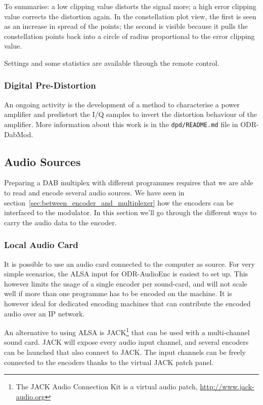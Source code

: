 To summarise: a low clipping value distorts the signal more; a high error
clipping value corrects the distortion again.
In the constellation plot view, the first is seen as an increase in spread of
the points; the second is visible because it pulls the constellation points back
into a circle of radius proportional to the error clipping value.

Settings and some statistics are available through the remote control.

\subsubsection{Digital Pre-Distortion}
An ongoing activity is the development of a method to characterise a power
amplifier and predistort the I/Q samples to invert the distortion behaviour of
the amplifier. More information about this work is in the \verb+dpd/README.md+
file in ODR-DabMod.


\subsection{Audio Sources}
Preparing a DAB multiplex with different programmes requires that we are able to
read and encode several audio sources. We have seen in
section~\ref{sec:between_encoder_and_multiplexer} how the encoders can be
interfaced to the modulator. In this section we'll go through the different ways
to carry the audio data to the encoder.

\subsubsection{Local Audio Card}
It is possible to use an audio card connected to the computer as source. For
very simple scenarios, the ALSA input for ODR-AudioEnc is easiest to set up.
This however limits the usage of a single encoder per sound-card, and will not
scale well if more than one programme has to be encoded on the machine. It is
however ideal for dedicated encoding machines that can contribute the encoded
audio over an IP network.

An alternative to using ALSA is JACK\footnote{The JACK Audio Connection Kit is a
    virtual audio patch, \url{http://www.jack-audio.org}}
that can be used with a multi-channel sound card. JACK will expose every audio
input channel, and several encoders can be launched that also connect to JACK.
The input channels can be freely connected to the encoders thanks to the virtual
JACK patch panel.

